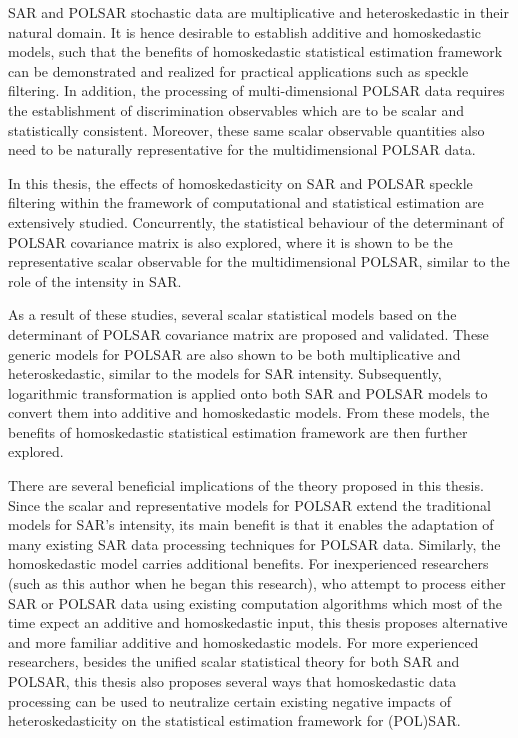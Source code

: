 

\begin{abstracts}        %

SAR and POLSAR stochastic data are multiplicative and heteroskedastic in their natural domain.
It is hence desirable to establish additive and homoskedastic models,
  such that the benefits of homoskedastic statistical estimation framework can be demonstrated and realized for practical applications such as speckle filtering.
In addition, the processing of multi-dimensional POLSAR data requires the establishment of discrimination observables
  which are to be scalar and statistically consistent.
Moreover, these same scalar observable quantities also need to be naturally representative for the multidimensional POLSAR data.

In this thesis, the effects of homoskedasticity on SAR and POLSAR speckle filtering within the framework of computational and statistical estimation are extensively studied. 
Concurrently, the statistical behaviour of the determinant of POLSAR covariance matrix is also explored,
  where it is shown to be the representative scalar observable for the multidimensional POLSAR, similar to the role of the intensity in SAR.

As a result of these studies, several scalar statistical models based on the determinant of POLSAR covariance matrix are proposed and validated.
These generic models for POLSAR are also shown to be both multiplicative and heteroskedastic, similar to the models for SAR intensity. 
Subsequently, logarithmic transformation is applied onto both SAR and POLSAR models
  to convert them into additive and homoskedastic models.
From these models, the benefits of homoskedastic statistical estimation framework are then further explored.

There are several beneficial implications of the theory proposed in this thesis. 
Since the scalar and representative models for POLSAR extend the traditional models for SAR's intensity,
  its main benefit is that it enables the adaptation of many existing SAR data processing techniques for POLSAR data.
Similarly, the homoskedastic model carries additional benefits.
For inexperienced researchers (such as this author when he began this research),
  who attempt to process either SAR or POLSAR data using existing computation algorithms
  which most of the time expect an additive and homoskedastic input,
  this thesis proposes alternative and more familiar additive and homoskedastic models.
For more experienced researchers, besides the unified scalar statistical theory for both SAR and POLSAR, 
  this thesis also proposes several ways that homoskedastic data processing can be used to neutralize certain existing negative impacts of heteroskedasticity on the statistical estimation framework for (POL)SAR.


\end{abstracts}
